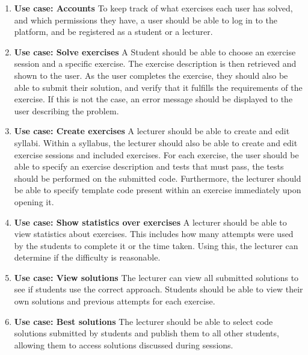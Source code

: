 \begin{enumerate}
    \item \textbf{Use case: Accounts}\newline
    To keep track of what exercises each user has solved, and which permissions they have, a user should be able to log in to the platform, and be registered as a student or a lecturer.
    \item \textbf{Use case: Solve exercises}\newline
    A Student should be able to choose an exercise session and a specific exercise. The exercise description is then retrieved and shown to the user.
    As the user completes the exercise, they should also be able to submit their solution, and verify that it fulfills the requirements of the exercise. If this is not the case, an error message should be displayed to the user describing the problem.
    
    \item \textbf{Use case: Create exercises}\newline
    A lecturer should be able to create and edit syllabi.
    Within a syllabus, the lecturer should also be able to create and edit exercise sessions and included exercises.
    For each exercise, the user should be able to specify an exercise description and tests that must pass, the tests should be performed on the submitted code. Furthermore, the lecturer should be able to specify template code present within an exercise immediately upon opening it.
    
    \item \textbf{Use case: Show statistics over exercises} \newline
    A lecturer should be able to view statistics about exercises.
    This includes how many attempts were used by the students to complete it or the time taken.
    Using this, the lecturer can determine if the difficulty is reasonable.

    \item \textbf{Use case: View solutions}\newline
    The lecturer can view all submitted solutions to see if students use the correct approach.
    Students should be able to view their own solutions and previous attempts for each exercise.

    \item \textbf{Use case: Best solutions}\newline
    The lecturer should be able to select code solutions submitted by students and publish them to all other students, allowing them to access solutions discussed during sessions.

\end{enumerate}
 


